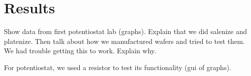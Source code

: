 \section{Results}

Show data from first potentiostat lab (graphs). Explain that we did salenize and platenize. Then talk about how we manufactured wafers and tried to test them. We had trouble getting this to work. Explain why. 

For potentiostat, we used a resistor to test its functionality (gui of graphs). 